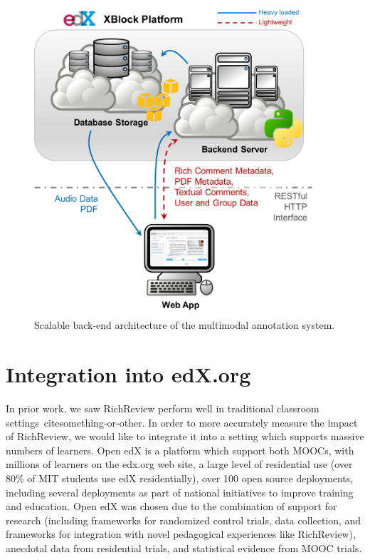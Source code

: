 \documentclass{sigchi}
\begin{document}
\begin{figure}[!h]
\centering
\includegraphics[width=0.95\columnwidth]{figure_architecture}
\caption{Scalable back-end architecture of the multimodal annotation system.}
\label{fig:scalable}
\end{figure}

\section{Integration into edX.org} 

In prior work, we saw RichReview perform well in traditional classroom settings~cite{something-or-other}. 
In order to more accurately measure the impact of RichReview, we would like to integrate it into a setting which supports massive numbers of learners. 
Open edX is a platform which support both MOOCs, with millions of learners on the edx.org web site, a large level of residential use (over 80\% of MIT students use edX residentially), over 100 open source deployments, including several deployments as part of national initiatives to improve training and education.
Open edX was chosen due to the combination of support for research (including frameworks for randomized control trials, data collection, and frameworks for integration with novel pedagogical experiences like RichReview), anecdotal data from residential trials, and statistical evidence from MOOC trials. 
\end{document}
